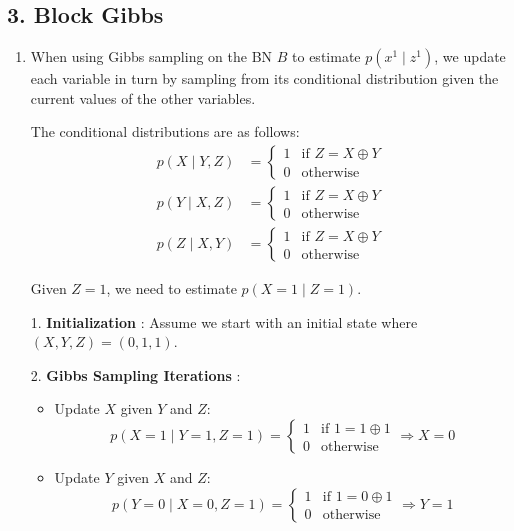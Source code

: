 \documentclass[a4 paper]{article}
\begin{document}
\newpage
\subsection*{3. Block Gibbs}


\begin{enumerate}
    \item {}
    
    When using Gibbs sampling on the BN \( B \) to estimate \( p(x^1 \mid z^1) \), we update each variable in turn by sampling from its 
    conditional distribution given the current values of the other variables.

    The conditional distributions are as follows:
    \[
    \begin{aligned}
        p(X \mid Y, Z) &= 
        \begin{cases} 
        1 & \text{if } Z = X \oplus Y \\
        0 & \text{otherwise} 
        \end{cases} \\
        p(Y \mid X, Z) &= 
        \begin{cases} 
        1 & \text{if } Z = X \oplus Y \\
        0 & \text{otherwise} 
        \end{cases} \\
        p(Z \mid X, Y) &= 
        \begin{cases} 
        1 & \text{if } Z = X \oplus Y \\
        0 & \text{otherwise} 
        \end{cases}
    \end{aligned}
    \]

    Given \( Z = 1 \), we need to estimate \( p(X = 1 \mid Z = 1) \).

    1. \textbf{Initialization} : Assume we start with an initial state where \( (X, Y, Z) = (0, 1, 1) \).

    2. \textbf{Gibbs Sampling Iterations} : 
    \begin{itemize}
        \item Update \( X \) given \( Y \) and \( Z \):
            \[
            p(X = 1 \mid Y = 1, Z = 1) = 
            \begin{cases} 
            1 & \text{if } 1 = 1 \oplus 1 \\ 
            0 & \text{otherwise} 
            \end{cases} \Rightarrow X = 0
            \]
        \item Update \( Y \) given \( X \) and \( Z \):
            \[
            p(Y = 0 \mid X = 0, Z = 1) = 
            \begin{cases} 
            1 & \text{if } 1 = 0 \oplus 1 \\
            0 & \text{otherwise}
            \end{cases} \Rightarrow Y = 1
            \]


\end{itemize}
\end{enumerate}
\end{document}
